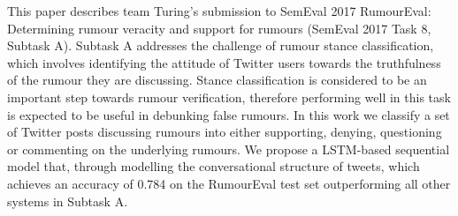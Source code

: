 This paper describes team Turing's submission to SemEval 2017 RumourEval: Determining rumour veracity and support for rumours (SemEval 2017 Task 8, Subtask A). Subtask A addresses the challenge of rumour stance classification, which involves identifying the attitude of Twitter users towards the truthfulness of the rumour they are discussing. Stance classification is considered to be an important step towards rumour verification, therefore performing well in this task is expected to be useful in debunking false rumours. In this work we classify a set of Twitter posts discussing rumours into either supporting, denying, questioning or commenting on the underlying rumours. We propose a LSTM-based sequential model that, through modelling the conversational structure of tweets, which achieves an accuracy of 0.784 on the RumourEval test set outperforming all other systems in Subtask A.
